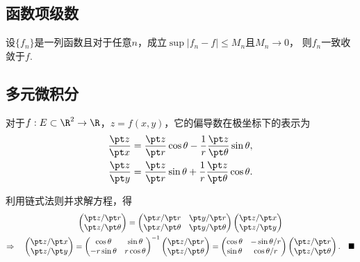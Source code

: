 \subsection{函数项级数}

  \begin{thm}
    设$\{f_n\}$是一列函数且对于任意$n$，成立$\sup|f_n-f|\le M_n$且$M_n\to 0$，
    则$f_n$一致收敛于$f$.
  \end{thm}


\subsection{多元微积分}

  \begin{thm}[偏导数的极坐标表示]
    \label{thm: 偏导数的极坐标表示}
    对于$f:E\subset\R^2\to\R$，$z=f(x,y)$，它的偏导数在极坐标下的表示为
    \[\begin{split}
      \frac{\pt z}{\pt x} &= \frac{\pt z}{\pt r}\cos\theta
        - \frac{1}{r}\frac{\pt z}{\pt\theta}\sin\theta,\\
      \frac{\pt z}{\pt y} &= \frac{\pt z}{\pt r}\sin\theta
       + \frac{1}{r}\frac{\pt z}{\pt\theta}\cos\theta.
    \end{split}\]
  \end{thm}
  \proof
    利用链式法则并求解方程，得
    \begin{gather*}
      \begin{pmatrix}
        \pt z/\pt r \\ \pt z/\pt \theta
      \end{pmatrix} =
      \begin{pmatrix}
        \pt x/\pt r & \pt y/\pt r \\
        \pt x/\pt \theta & \pt y/\pt\theta
      \end{pmatrix}
      \begin{pmatrix}
        \pt z/\pt x \\ \pt z/\pt y
      \end{pmatrix} \\
      \Rightarrow\quad
      \begin{pmatrix}
        \pt z/\pt x \\ \pt z/\pt y
      \end{pmatrix} =
      \begin{pmatrix}
        \cos\theta & \sin\theta \\
        -r\sin\theta & r\cos\theta
      \end{pmatrix}^{-1}
      \begin{pmatrix}
        \pt z/\pt r \\ \pt z/\pt \theta
      \end{pmatrix}=
      \begin{pmatrix}
        \cos\theta & -\sin\theta / r \\
        \sin\theta & \cos\theta / r
      \end{pmatrix}
      \begin{pmatrix}
        \pt z/\pt r \\ \pt z/\pt \theta
      \end{pmatrix}.\quad\blacksquare
    \end{gather*}


